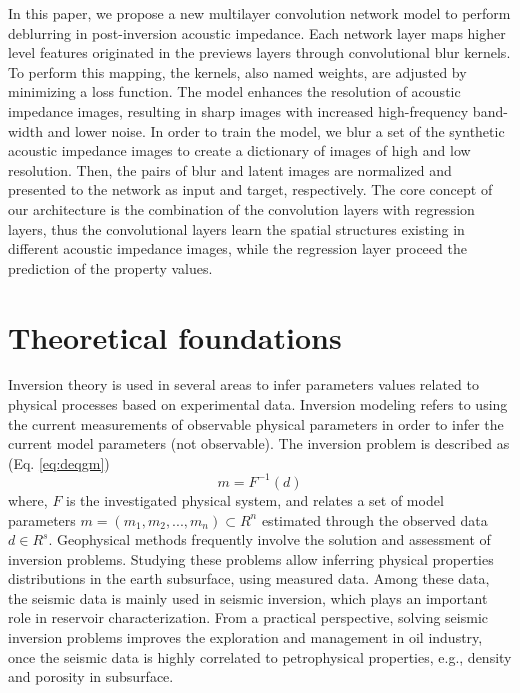 \documentclass[conference,compsoc]{IEEEtran}
\begin{document}
In this paper, we propose a new multilayer convolution network model to perform deblurring in post-inversion acoustic impedance.
Each network layer maps higher level features originated in the previews layers through convolutional blur kernels.
To perform this mapping, the kernels, also named weights, are adjusted by minimizing a loss function. 
The model enhances the resolution of acoustic impedance images, resulting in sharp images with
increased high-frequency band-width and lower noise. 
In order to train the model, we blur a set of the synthetic acoustic impedance images to create a dictionary of
images of high and low resolution. Then, the pairs of blur and latent images are normalized and 
presented to the network as input and target, respectively.
The core concept of our architecture is the combination of the convolution layers with regression
layers, thus the convolutional layers learn the spatial structures existing in different
acoustic impedance images, while the regression layer proceed the prediction of the property values.
 

\section{Theoretical foundations}
Inversion theory is used in several areas to infer parameters values
related to physical processes based on experimental data.
Inversion modeling refers to using the current measurements of observable
physical parameters in order to infer the current model parameters (not observable).
The inversion problem is described as (Eq. \ref{eq:deqgm})
\begin{equation}
\label{eq:deqgm}
m = F^{-1}(d)
\end{equation}
where, $F$ is the investigated physical system, and relates a set of model parameters
$m=(m_1, m_2,...,m_n)\subset R^n$ estimated through the observed data $d \in R^s$.
Geophysical methods frequently involve the solution and assessment of inversion problems.
Studying these problems allow inferring physical properties distributions in the earth subsurface, using measured
data. Among these data, the seismic data is mainly used in seismic inversion, which plays an important role in
reservoir characterization. From a practical perspective, solving seismic inversion problems improves
the exploration and management in oil industry, once the seismic data is highly correlated to petrophysical
properties, e.g., density and porosity in subsurface.
\end{document}
